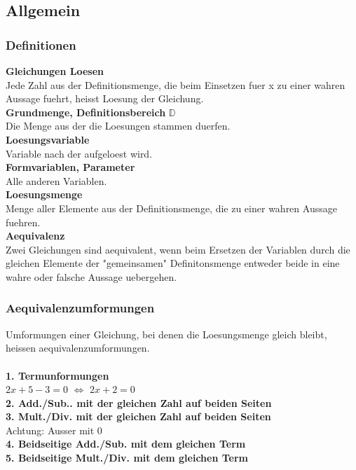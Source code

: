 \begin{multicols}{2}
    \subsection{Allgemein}
    \vspace{-4mm}
    \subsubsection{Definitionen}
    \vspace{-4mm}
    \textbf{Gleichungen Loesen} \\
    Jede Zahl aus der Definitionsmenge, die beim Einsetzen fuer x zu einer wahren Aussage fuehrt, heisst Loesung der Gleichung. \\
    \textbf{Grundmenge, Definitionsbereich} $\mathbb{D}$ \\
    Die Menge aus der die Loesungen stammen duerfen. \\
    \textbf{Loesungsvariable} \\
    Variable nach der aufgeloest wird. \\
    \textbf{Formvariablen, Parameter} \\
    Alle anderen Variablen. \\
    \textbf{Loesungsmenge} \\
    Menge aller Elemente aus der Definitionsmenge, die zu einer wahren Aussage fuehren. \\
    \textbf{Aequivalenz} \\
    Zwei Gleichungen sind aequivalent, wenn beim Ersetzen der Variablen durch die gleichen Elemente der "gemeinsamen" Definitonsmenge entweder beide in eine wahre oder falsche Aussage uebergehen.

    \subsubsection{Aequivalenzumformungen}
    \vspace{-4mm}
    Umformungen einer Gleichung, bei denen die Loesungsmenge gleich bleibt, heissen aequivalenzumformungen.\\~\\
    \textbf{1. Termunformungen}\\
    $2x+5-3=0$ $\Longleftrightarrow$ $2x +2 = 0$ \\
    \textbf{2. Add./Sub.. mit der gleichen Zahl auf beiden Seiten} \\
    \textbf{3. Mult./Div. mit der gleichen Zahl auf beiden Seiten} \\
    Achtung: Ausser mit 0 \\
    \textbf{4. Beidseitige Add./Sub. mit dem gleichen Term} \\
    \textbf{5. Beidseitige Mult./Div. mit dem gleichen Term}


\end{multicols}
